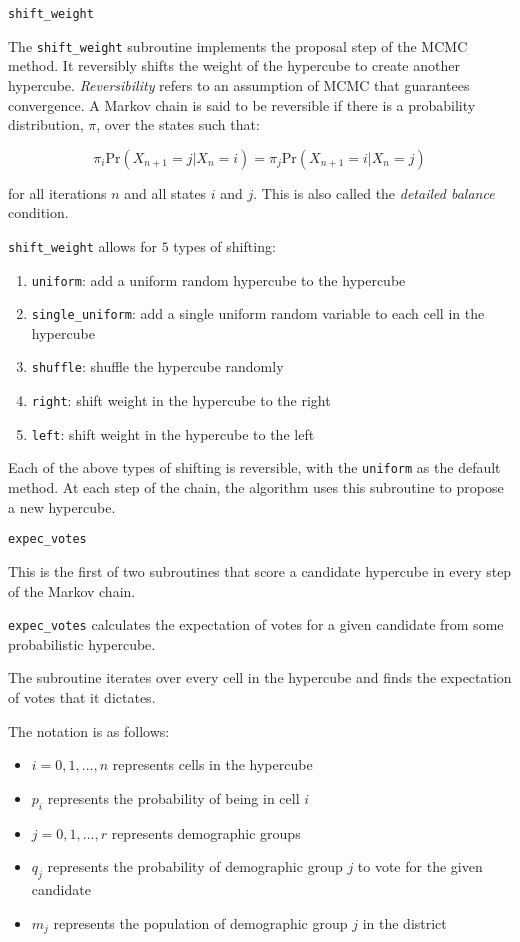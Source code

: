 \texttt{shift\_weight}


The \texttt{shift\_weight} subroutine implements the proposal step of the MCMC method. It reversibly shifts the weight of the hypercube to create another hypercube. \textit{Reversibility} refers to an assumption of MCMC that guarantees convergence. A Markov chain is said to be reversible if there is a probability distribution, $\pi$, over the states such that:

$$\pi_i \text{Pr}(X_{n+1} = j | X_n = i) = \pi_j \text{Pr}(X_{n+1} = i | X_n = j)$$

for all iterations $n$ and all states $i$ and $j$. This is also called the \textit{detailed balance} condition.

\texttt{shift\_weight} allows for $5$ types of shifting:

\begin{enumerate}
  \item \texttt{uniform}: add a uniform random hypercube to the hypercube
  \item \texttt{single\_uniform}: add a single uniform random variable to each cell in the hypercube
  \item \texttt{shuffle}: shuffle the hypercube randomly
  \item \texttt{right}: shift weight in the hypercube to the right
  \item \texttt{left}: shift weight in the hypercube to the left
\end{enumerate}

Each of the above types of shifting is reversible, with the \texttt{uniform} as the default method. At each step of the chain, the algorithm uses this subroutine to propose a new hypercube.


\texttt{expec\_votes}


This is the first of two subroutines that score a candidate hypercube in every step of the Markov chain.

\texttt{expec\_votes} calculates the expectation of votes for a given candidate from some probabilistic hypercube.

The subroutine iterates over every cell in the hypercube and finds the expectation of votes that it dictates.

The notation is as follows:

\begin{itemize}
  \item $i = 0, 1, \dots, n$ represents cells in the hypercube
  \item $p_i$ represents the probability of being in cell $i$
  \item $j = 0, 1, \dots, r$ represents demographic groups
  \item $q_j$ represents the probability of demographic group $j$ to vote for the given candidate
  \item $m_j$ represents the population of demographic group $j$ in the district
\end{itemize}

